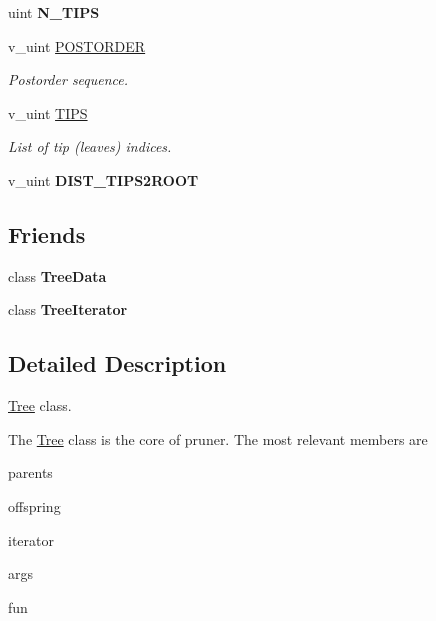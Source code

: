 \begin{DoxyCompactItemize}
\item 
uint {\bfseries N\+\_\+\+T\+I\+PS}\hypertarget{classTree_afe09b17dd0f475dcbc4054892863050e}{}\label{classTree_afe09b17dd0f475dcbc4054892863050e}

\item 
v\+\_\+uint \hyperlink{classTree_a310e76b803db38e7067514822b21a58f}{P\+O\+S\+T\+O\+R\+D\+ER}
\begin{DoxyCompactList}\small\item\em Postorder sequence. \end{DoxyCompactList}\item 
v\+\_\+uint \hyperlink{classTree_a486adc6260e94490b485e205e8e70b1f}{T\+I\+PS}\hypertarget{classTree_a486adc6260e94490b485e205e8e70b1f}{}\label{classTree_a486adc6260e94490b485e205e8e70b1f}

\begin{DoxyCompactList}\small\item\em List of tip (leaves) indices. \end{DoxyCompactList}\item 
v\+\_\+uint {\bfseries D\+I\+S\+T\+\_\+\+T\+I\+P\+S2\+R\+O\+OT}\hypertarget{classTree_af6b0afbf17f53ef49a43f9b640d92fde}{}\label{classTree_af6b0afbf17f53ef49a43f9b640d92fde}

\end{DoxyCompactItemize}
\subsection*{Friends}
\begin{DoxyCompactItemize}
\item 
class {\bfseries Tree\+Data}\hypertarget{classTree_a3ef069a6a857ec671312e3f76cb5aa24}{}\label{classTree_a3ef069a6a857ec671312e3f76cb5aa24}

\item 
class {\bfseries Tree\+Iterator}\hypertarget{classTree_a925e5a7f5dc110e63f7062d0e6898af9}{}\label{classTree_a925e5a7f5dc110e63f7062d0e6898af9}

\end{DoxyCompactItemize}


\subsection{Detailed Description}
\hyperlink{classTree}{Tree} class. 

The \hyperlink{classTree}{Tree} class is the core of pruner. The most relevant members are
\begin{DoxyItemize}
\item {\ttfamily parents}
\item {\ttfamily offspring}
\item {\ttfamily iterator}
\item {\ttfamily args}
\item {\ttfamily fun} 
\end{DoxyItemize}

